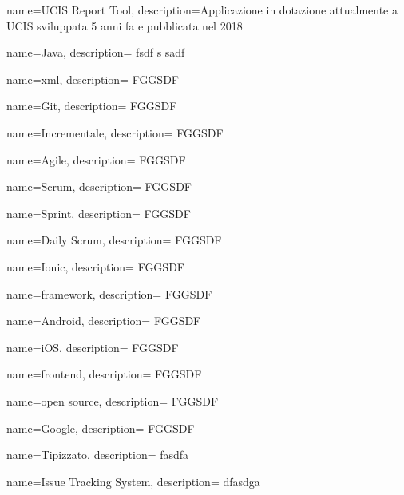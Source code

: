 {
  name=UCIS Report Tool,
  description={Applicazione in dotazione attualmente a UCIS sviluppata 5 anni fa e pubblicata nel 2018}
}

{
  name=Java,
  description={ fsdf s sadf }
}

{
  name=xml,
  description={ FGGSDF }
}

{
  name=Git,
  description={ FGGSDF }
}

{
  name=Incrementale,
  description={ FGGSDF }
}

{
  name=Agile,
  description={ FGGSDF }
}

{
  name=Scrum,
  description={ FGGSDF }
}

{
  name=Sprint,
  description={ FGGSDF }
}

{
  name=Daily Scrum,
  description={ FGGSDF }
}

{
  name=Ionic,
  description={ FGGSDF }
}

{
  name=framework,
  description={ FGGSDF }
}

{
  name=Android,
  description={ FGGSDF }
}

{
  name=iOS,
  description={ FGGSDF }
}

{
  name=frontend,
  description={ FGGSDF }
}

{
  name=open source,
  description={ FGGSDF }
}

{
  name=Google,
  description={ FGGSDF }
}

{
  name=Tipizzato,
  description= { fasdfa }
}

{
  name=Issue Tracking System,
  description={ dfasdga }
}
